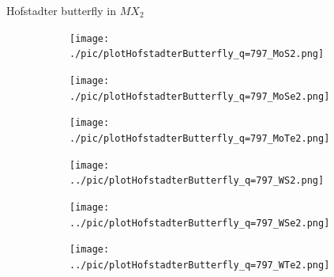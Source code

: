 \documentclass[aspectratio=169,compress,x11names]{beamer}
\begin{document}
	\begin{frame}{Hofstadter butterfly in $MX_{2}$}
		\begin{figure}
			\begin{subfigure}[b]{0.3\linewidth}
				\centering
				\texttt{[image: ./pic/plotHofstadterButterfly\_q=797\_MoS2.png]}
			\end{subfigure}
			\begin{subfigure}[b]{0.3\linewidth}
				\centering
				\texttt{[image: ./pic/plotHofstadterButterfly\_q=797\_MoSe2.png]}
			\end{subfigure}
			\begin{subfigure}[b]{0.3\linewidth}
				\centering
				\texttt{[image: ./pic/plotHofstadterButterfly\_q=797\_MoTe2.png]}
			\end{subfigure}
			\begin{subfigure}[b]{0.3\linewidth}
				\centering
				\texttt{[image: ../pic/plotHofstadterButterfly\_q=797\_WS2.png]}
			\end{subfigure}
			\begin{subfigure}[b]{0.3\linewidth}
				\centering
				\texttt{[image: ../pic/plotHofstadterButterfly\_q=797\_WSe2.png]}
			\end{subfigure}
			\begin{subfigure}[b]{0.3\linewidth}
				\centering
				\texttt{[image: ../pic/plotHofstadterButterfly\_q=797\_WTe2.png]}
			\end{subfigure}
		\end{figure}
	\end{frame}
\end{document}
